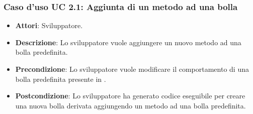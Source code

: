 \subsubsection{Caso d'uso UC 2.1: Aggiunta di un metodo ad una bolla}

\FloatBarrier
\begin{itemize}
\item\textbf{Attori}: Sviluppatore.
\item\textbf{Descrizione}: Lo sviluppatore vuole aggiungere un nuovo metodo ad una bolla predefinita.
\item\textbf{Precondizione}: Lo sviluppatore vuole modificare il comportamento di una bolla predefinita presente in \progetto.
\item\textbf{Postcondizione}: Lo sviluppatore ha generato codice eseguibile per creare una nuova bolla derivata aggiungendo un metodo ad una bolla predefinita.
\end{itemize}